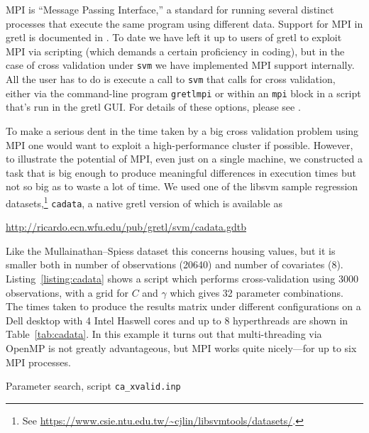 \documentclass{article}
\begin{document}
MPI is ``Message Passing Interface,'' a standard for running several
distinct processes that execute the same program using different
data. Support for MPI in gretl is documented in \cite{gretl-mpi}.  To
date we have left it up to users of gretl to exploit MPI via scripting
(which demands a certain proficiency in coding), but in the case of
cross validation under \texttt{svm} we have implemented MPI support
internally. All the user has to do is execute a call to \texttt{svm}
that calls for cross validation, either via the command-line program
\texttt{gretlmpi} or within an \texttt{mpi} block in a script that's
run in the gretl GUI. For details of these options, please see
\cite{gretl-mpi}.

To make a serious dent in the time taken by a big cross validation
problem using MPI one would want to exploit a high-performance cluster
if possible. However, to illustrate the potential of MPI, even just on
a single machine, we constructed a task that is big enough to produce
meaningful differences in execution times but not so big as to waste a
lot of time. We used one of the \textsf{libsvm} sample regression
datasets,\footnote{See
  \url{https://www.csie.ntu.edu.tw/~cjlin/libsvmtools/datasets/}.}
\texttt{cadata}, a native gretl version of which is available as

\url{http://ricardo.ecn.wfu.edu/pub/gretl/svm/cadata.gdtb}

Like the Mullainathan--Spiess dataset this concerns housing values,
but it is smaller both in number of observations (20640) and number of
covariates (8).  Listing~\ref{listing:cadata} shows a script which
performs cross-validation using 3000 observations, with a grid for $C$
and $\gamma$ which gives 32 parameter combinations. The times taken to
produce the results matrix under different configurations on a Dell
desktop with 4 Intel Haswell cores and up to 8 hyperthreads are shown
in Table~\ref{tab:cadata}. In this example it turns out that
multi-threading via \textsf{OpenMP} is not greatly advantageous, but
MPI works quite nicely---for up to six MPI processes.

\begin{script}[htbp]
  \caption{Parameter search, script \texttt{ca\_xvalid.inp}}
  \label{listing:cadata}
\end{script}
\end{document}
